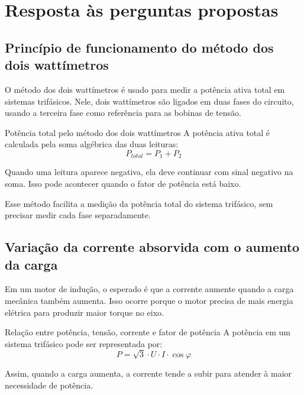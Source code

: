 \documentclass[12pt,a4paper]{article}
\begin{document}
\section{Resposta às perguntas propostas}

\subsection{Princípio de funcionamento do método dos dois wattímetros}

O método dos dois wattímetros é usado para medir a potência ativa total em sistemas trifásicos. Nele, dois wattímetros são ligados em duas fases do circuito, usando a terceira fase como referência para as bobinas de tensão.

\begin{caixacalculo}{Potência total pelo método dos dois wattímetros}
A potência ativa total é calculada pela soma algébrica das duas leituras:
\begin{equation*}
P_{total}=P_1+P_2
\end{equation*}

Quando uma leitura aparece negativa, ela deve continuar com sinal negativo na soma. Isso pode acontecer quando o fator de potência está baixo.
\end{caixacalculo}

Esse método facilita a medição da potência total do sistema trifásico, sem precisar medir cada fase separadamente.

\subsection{Variação da corrente absorvida com o aumento da carga}

Em um motor de indução, o esperado é que a corrente aumente quando a carga mecânica também aumenta. Isso ocorre porque o motor precisa de mais energia elétrica para produzir maior torque no eixo.

\begin{caixacalculo}{Relação entre potência, tensão, corrente e fator de potência}
A potência em um sistema trifásico pode ser representada por:
\begin{equation*}
P=\sqrt{3}\cdot U\cdot I\cdot \cos\varphi
\end{equation*}

Assim, quando a carga aumenta, a corrente tende a subir para atender à maior necessidade de potência.
\end{caixacalculo}
\end{document}
